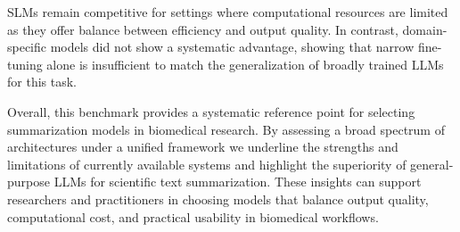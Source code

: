\acp{SLM} remain competitive for settings where computational resources are limited as they offer balance between efficiency and output quality. In contrast, domain-specific models did not show a systematic advantage, showing that narrow fine-tuning alone is insufficient to match the generalization of broadly trained \acp{LLM} for this task.

Overall, this benchmark provides a systematic reference point for selecting summarization models in biomedical research. By assessing a broad spectrum of architectures under a unified framework we underline the strengths and limitations of currently available systems and highlight the superiority of general-purpose \acp{LLM} for scientific text summarization. These insights can support researchers and practitioners in choosing models that balance output quality, computational cost, and practical usability in biomedical workflows.